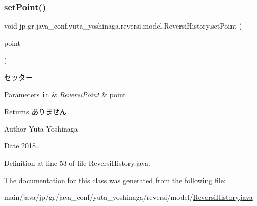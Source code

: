 \subsubsection{\texorpdfstring{set\+Point()}{setPoint()}}
{\footnotesize\ttfamily void jp.\+gr.\+java\+\_\+conf.\+yuta\+\_\+yoshinaga.\+reversi.\+model.\+Reversi\+History.\+set\+Point (\begin{DoxyParamCaption}\item[{\hyperlink{classjp_1_1gr_1_1java__conf_1_1yuta__yoshinaga_1_1reversi_1_1model_1_1_reversi_point}{Reversi\+Point}}]{point }\end{DoxyParamCaption})}



セッター 


\begin{DoxyParams}[1]{Parameters}
\mbox{\tt in}  & {\em \hyperlink{classjp_1_1gr_1_1java__conf_1_1yuta__yoshinaga_1_1reversi_1_1model_1_1_reversi_point}{Reversi\+Point}} & point \\
\hline
\end{DoxyParams}
\begin{DoxyReturn}{Returns}
ありません 
\end{DoxyReturn}
\begin{DoxyAuthor}{Author}
Yuta Yoshinaga 
\end{DoxyAuthor}
\begin{DoxyDate}{Date}
2018.. 
\end{DoxyDate}


Definition at line 53 of file Reversi\+History.\+java.



The documentation for this class was generated from the following file\+:\begin{DoxyCompactItemize}
\item 
main/java/jp/gr/java\+\_\+conf/yuta\+\_\+yoshinaga/reversi/model/\hyperlink{_reversi_history_8java}{Reversi\+History.\+java}\end{DoxyCompactItemize}

